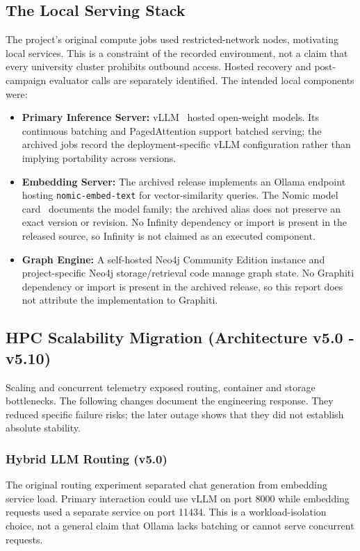 \subsection{The Local Serving Stack}
The project's original compute jobs used restricted-network nodes, motivating local services. This is a constraint of the recorded environment, not a claim that every university cluster prohibits outbound access. Hosted recovery and post-campaign evaluator calls are separately identified. The intended local components were:
\begin{itemize}
    \item \textbf{Primary Inference Server:} vLLM~\cite{vllm} hosted open-weight models. Its continuous batching and PagedAttention support batched serving; the archived jobs record the deployment-specific vLLM configuration rather than implying portability across versions.
    \item \textbf{Embedding Server:} The archived release implements an Ollama endpoint~\cite{ollamasoftware} hosting \texttt{nomic-embed-text} for vector-similarity queries. The Nomic model card~\cite{nomiccard} documents the model family; the archived alias does not preserve an exact version or revision. No Infinity dependency or import is present in the released source, so Infinity is not claimed as an executed component.
    \item \textbf{Graph Engine:} A self-hosted Neo4j Community Edition instance and project-specific Neo4j storage/retrieval code manage graph state. No Graphiti dependency or import is present in the archived release, so this report does not attribute the implementation to Graphiti.
\end{itemize}

\subsection{HPC Scalability Migration (Architecture v5.0 - v5.10)}
Scaling and concurrent telemetry exposed routing, container and storage bottlenecks. The following changes document the engineering response. They reduced specific failure risks; the later outage shows that they did not establish absolute stability.

\subsubsection{Hybrid LLM Routing (v5.0)}
The original routing experiment separated chat generation from embedding service load. Primary interaction could use vLLM on port 8000 while embedding requests used a separate service on port 11434. This is a workload-isolation choice, not a general claim that Ollama lacks batching or cannot serve concurrent requests.

